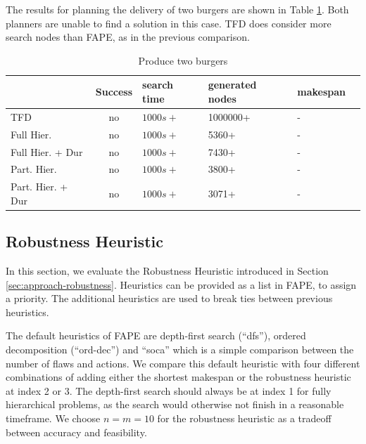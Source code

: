 The results for planning the delivery of two burgers are shown in Table \ref{tab:eval-burgers}.
Both planners are unable to find a solution in this case.
TFD does consider more search nodes than FAPE, as in the previous comparison.

\begin{table}
  \centering
  \begin{tabular}{lcllll}
    & Success & search time  & generated nodes & makespan         \\
  \hline
  TFD             & no & $1000s+$ & 1000000+ &  -       \\
  Full Hier.            & no & $1000s+$ & 5360+    &  -          \\
  Full Hier. + Dur      & no & $1000s+$ & 7430+    &  -    \\
  Part. Hier.       & no & $1000s+$ & 3800+    &  - \\
  Part. Hier. + Dur & no & $1000s+$ & 3071+    &  -          \\
  \end{tabular}
  \caption{Produce two burgers}
  \label{tab:eval-burgers}
\end{table}

\subsection{Robustness Heuristic}
\label{sec:evaluation-robustness}

In this section, we evaluate the Robustness Heuristic introduced in Section \ref{sec:approach-robustness}.
Heuristics can be provided as a list in FAPE, to assign a priority.
The additional heuristics are used to break ties between previous heuristics.

The default heuristics of FAPE are depth-first search (``dfs''), ordered decomposition (``ord-dec'') and ``soca'' which is a simple comparison between the number of flaws and actions.
We compare this default heuristic with four different combinations of adding either the shortest makespan or the robustness heuristic at index 2 or 3.
The depth-first search should always be at index 1 for fully hierarchical problems, as the search would otherwise not finish in a reasonable timeframe.
We choose $n=m=10$ for the robustness heuristic as a tradeoff between accuracy and feasibility.


